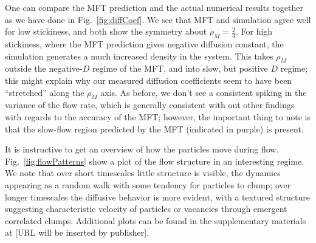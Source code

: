 \documentclass[
reprint,
 amsmath,amssymb,
 aps,
 prl,
]{revtex4-1}
\begin{document}
One can compare the MFT prediction and the actual numerical results together as we have done in Fig.~\ref{fig:diffCoef}. We see that MFT and simulation agree well for low stickiness, and both show the symmetry
about $\rho_M = \frac{2}{3}$. For high stickiness, where the MFT prediction gives negative diffusion constant, the simulation generates a much increased density in the system.  This takes $\rho_M$ outside the negative-$D$ regime of the MFT,
and into slow, but positive $D$ regime; this might explain why our measured diffusion coefficients seem to have been ``stretched'' along the $\rho_M$ axis. As before, we don't see a consistent spiking in the variance of the flow rate,
which is generally consistent with out other findings with
regards to the accuracy of the MFT; however, the important thing to note is that the slow-flow region predicted by the MFT (indicated in purple) is present.

It is instructive to get an overview of how the particles move during flow. Fig.~\ref{fig:flowPatterns} show a plot of the flow structure in an interesting regime.
We note that over short timescales little structure is visible, the dynamics appearing as a random walk with some tendency for particles to clump; over longer timescales the diffusive behavior is more evident, with a textured structure suggesting characteristic velocity of  particles or vacancies through emergent correlated clumps.
Additional plots can be found in the supplementary materials at [URL will be inserted by publisher].
\end{document}

